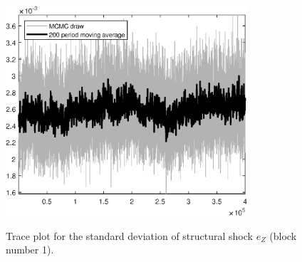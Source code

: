 \begin{figure}[H]
\centering
  \includegraphics[width=0.8\textwidth]{BRS_growth/graphs/TracePlot_SE_e_Z_blck_1}\\
    \caption{Trace plot for the standard deviation of structural shock ${e_Z}$ (block number 1).}
\end{figure}
